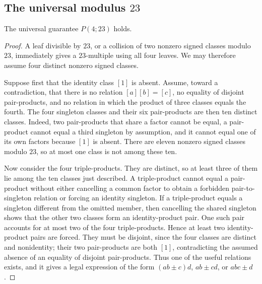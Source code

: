 \subsection{\texorpdfstring{The universal modulus $23$}{The universal modulus 23}}\label{app:p23}

\begin{theorem}\label{thm:p23}
The universal guarantee $P(4;23)$ holds.
\end{theorem}
\begin{proof}
A leaf divisible by $23$, or a collision of two nonzero signed classes
modulo $23$, immediately gives a $23$-multiple using all four leaves.  We may
therefore assume four distinct nonzero signed classes.

Suppose first that the identity class $[1]$ is absent.  Assume, toward a
contradiction, that there is no relation $[a][b]=[c]$, no equality of
disjoint pair-products, and no relation in which the product of three
classes equals the fourth.  The four singleton classes and their six
pair-products are then ten distinct classes.  Indeed, two pair-products that
share a factor cannot be equal, a pair-product cannot equal a third singleton
by assumption, and it cannot equal one of its own factors because $[1]$ is
absent.  There are eleven nonzero signed classes modulo $23$, so at most one
class is not among these ten.

Now consider the four triple-products.  They are distinct, so at least three
of them lie among the ten classes just described.  A triple-product cannot
equal a pair-product without either cancelling a common factor to obtain a
forbidden pair-to-singleton relation or forcing an identity singleton.  If a
triple-product equals a singleton different from the omitted member, then
cancelling the shared singleton shows that the other two classes form an
identity-product pair.  One such pair accounts for at most two of the four
triple-products.  Hence at least two identity-product pairs are forced.  They
must be disjoint, since the four classes are distinct and nonidentity; their
two pair-products are both $[1]$, contradicting the assumed absence of an
equality of disjoint pair-products.  Thus one of the useful relations exists,
and it gives a legal expression of the form $(ab\pm c)d$, $ab\pm cd$, or
$abc\pm d$.


\end{proof}
